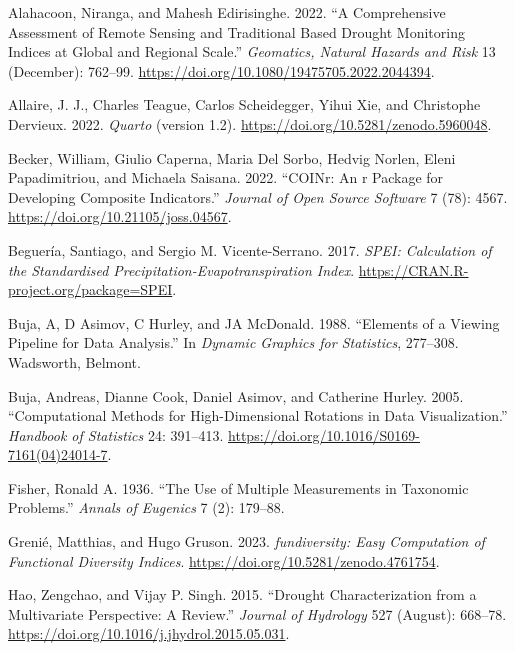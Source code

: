 \documentclass[
]{interact}
\newlength{\cslhangindent}
\newlength{\cslentryspacingunit} %
\newenvironment{CSLReferences}[2] %
 {%
  \setlength{\parindent}{0pt}
  \ifodd #1
  \let\oldpar\par
  \def\par{\hangindent=\cslhangindent\oldpar}
  \fi
  \setlength{\parskip}{#2\cslentryspacingunit}
 }%
 {}
\begin{document}
\hypertarget{refs}{}
\begin{CSLReferences}{1}{0}
\leavevmode{}%
Alahacoon, Niranga, and Mahesh Edirisinghe. 2022. {``A Comprehensive
Assessment of Remote Sensing and Traditional Based Drought Monitoring
Indices at Global and Regional Scale.''} \emph{Geomatics, Natural
Hazards and Risk} 13 (December): 762--99.
\url{https://doi.org/10.1080/19475705.2022.2044394}.

\leavevmode{}%
Allaire, J. J., Charles Teague, Carlos Scheidegger, Yihui Xie, and
Christophe Dervieux. 2022. \emph{{Quarto}} (version 1.2).
\url{https://doi.org/10.5281/zenodo.5960048}.

\leavevmode{}%
Becker, William, Giulio Caperna, Maria Del Sorbo, Hedvig Norlen, Eleni
Papadimitriou, and Michaela Saisana. 2022. {``COINr: An r Package for
Developing Composite Indicators.''} \emph{Journal of Open Source
Software} 7 (78): 4567. \url{https://doi.org/10.21105/joss.04567}.

\leavevmode{}%
Beguería, Santiago, and Sergio M. Vicente-Serrano. 2017. \emph{SPEI:
Calculation of the Standardised Precipitation-Evapotranspiration Index}.
\url{https://CRAN.R-project.org/package=SPEI}.

\leavevmode{}%
Buja, A, D Asimov, C Hurley, and JA McDonald. 1988. {``Elements of a
Viewing Pipeline for Data Analysis.''} In \emph{Dynamic Graphics for
Statistics}, 277--308. Wadsworth, Belmont.

\leavevmode{}%
Buja, Andreas, Dianne Cook, Daniel Asimov, and Catherine Hurley. 2005.
{``Computational Methods for High-Dimensional Rotations in Data
Visualization.''} \emph{Handbook of Statistics} 24: 391--413.
\url{https://doi.org/10.1016/S0169-7161(04)24014-7}.

\leavevmode{}%
Fisher, Ronald A. 1936. {``The Use of Multiple Measurements in Taxonomic
Problems.''} \emph{Annals of Eugenics} 7 (2): 179--88.

\leavevmode{}%
Grenié, Matthias, and Hugo Gruson. 2023. \emph{{fundiversity}: Easy
Computation of Functional Diversity Indices}.
\url{https://doi.org/10.5281/zenodo.4761754}.

\leavevmode{}%
Hao, Zengchao, and Vijay P. Singh. 2015. {``Drought Characterization
from a Multivariate Perspective: {A} Review.''} \emph{Journal of
Hydrology} 527 (August): 668--78.
\url{https://doi.org/10.1016/j.jhydrol.2015.05.031}.


\end{CSLReferences}
\end{document}
